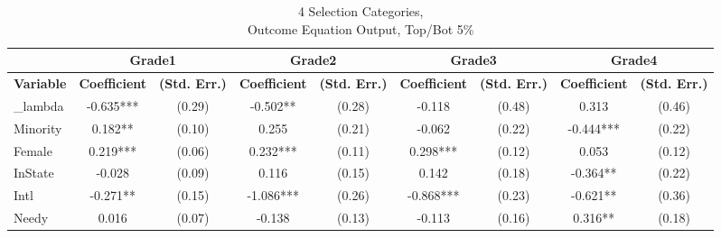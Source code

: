 \begin{sidewaystable}[htb]\centering
  \begin{threeparttable}
    \caption{4 Selection Categories, \\Outcome Equation Output, Top/Bot 5\%}\label{table:b11}
    \begin{tabular}{l|c|c|c|c|c|c|c|c}
      \hline\hline 
                        & \multicolumn{2}{|c|}{Grade1} & \multicolumn{2}{|c|}{Grade2} & \multicolumn{2}{|c}{Grade3} & \multicolumn{2}{|c}{Grade4}                                                                                      \\
      \hline
      \textbf{Variable} & \textbf{Coefficient}         & \textbf{(Std. Err.)}         & \textbf{Coefficient}        & \textbf{(Std. Err.)} & \textbf{Coefficient} & \textbf{(Std. Err.)} & \textbf{Coefficient} & \textbf{(Std. Err.)} \\ 
      \hline
      \hline 
      \_lambda          & -0.635***                    & (0.29)                       & -0.502**                    & (0.28)               & -0.118               & (0.48)               & 0.313                & (0.46)               \\
      Minority          & 0.182**                      & (0.10)                       & 0.255                       & (0.21)               & -0.062               & (0.22)               & -0.444***            & (0.22)               \\
      Female            & 0.219***                     & (0.06)                       & 0.232***                    & (0.11)               & 0.298***             & (0.12)               & 0.053                & (0.12)               \\
      InState                & -0.028                       & (0.09)                       & 0.116                       & (0.15)               & 0.142                & (0.18)               & -0.364**             & (0.22)               \\
      Intl              & -0.271**                     & (0.15)                       & -1.086***                   & (0.26)               & -0.868***            & (0.23)               & -0.621**             & (0.36)               \\
      Needy             & 0.016                        & (0.07)                       & -0.138                      & (0.13)               & -0.113               & (0.16)               & 0.316**              & (0.18)               \\

\end{tabular}
\end{threeparttable}
\end{sidewaystable}

